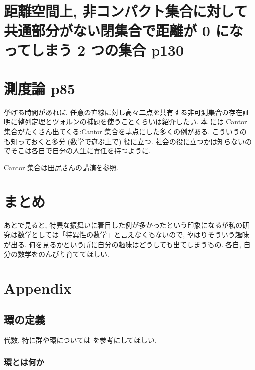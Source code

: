 \documentclass[openany, a4paper, oneside]{book}
\theoremstyle{break}
\theoremstyle{breakdefn}
\begin{document}
\section{距離空間上, 非コンパクト集合に対して共通部分がない閉集合で距離が 0 になってしまう 2 つの集合 \cite{GelbaumOlmsted1} p130}
\label{sec-11-3-14}
\section{測度論 \cite{GelbaumOlmsted1} p85}
\label{sec-11-3-15}

挙げる時間があれば, 任意の直線に対し高々二点を共有する非可測集合の存在証明に整列定理とツォルンの補題を使うことくらいは紹介したい.
本 \cite{GelbaumOlmsted1} には Cantor 集合がたくさん出てくる:Cantor 集合を基点にした多くの例がある.
こういうのも知っておくと多分 (数学で遊ぶ上で) 役に立つ.
社会の役に立つかは知らないのでそこは各自で自分の人生に責任を持つように.

Cantor 集合は田尻さんの講演を参照.
\section{まとめ}
\label{sec-11-3-16}

あとで見ると, 特異な振舞いに着目した例が多かったという印象になるが私の研究は数学としては「特異性の数学」と言えなくもないので,
やはりそういう趣味が出る.
何を見るかという所に自分の趣味はどうしても出てしまうもの.
各自, 自分の数学をのんびり育ててほしい.
\section{Appendix}
\label{sec-11-3-17}
\subsection{環の定義}
\label{sec-11-3-17-1}

代数, 特に群や環については \cite{ToshiyukiKatsura1} を参考にしてほしい.
\subsubsection{環とは何か}
\label{sec-11-3-17-1-1}
\end{document}
